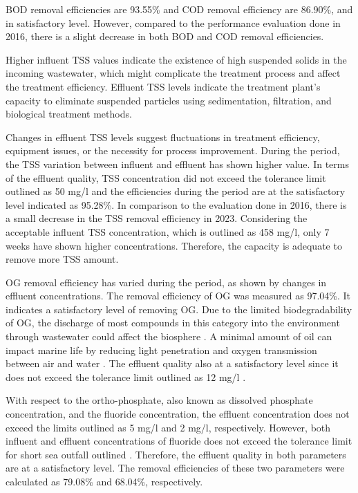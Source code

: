 \ac{BOD} removal efficiencies are 93.55\% and \ac{COD} removal efficiency are 86.90\%, and in satisfactory level. However, compared to the performance evaluation done in 2016, there is a slight decrease in both \ac{BOD} and \ac{COD} removal efficiencies.

Higher influent \ac{TSS} values indicate the existence of high suspended solids in the incoming wastewater, which might complicate the treatment process and affect the treatment efficiency. Effluent \ac{TSS} levels indicate the treatment plant's capacity to eliminate suspended particles using sedimentation, filtration, and biological treatment methods.

Changes in effluent \ac{TSS} levels suggest fluctuations in treatment efficiency, equipment issues, or the necessity for process improvement. During the period, the \ac{TSS} variation between influent and effluent has shown higher value. In terms of the effluent quality, \ac{TSS} concentration did not exceed the tolerance limit outlined as 50 mg/l \cite{CEA2022} and the efficiencies during the period are at the satisfactory level indicated as 95.28\%. In comparison to the evaluation done in 2016\cite{Danushika2016}, there is a small decrease in the \ac{TSS} removal efficiency in 2023.  Considering the acceptable influent \ac{TSS} concentration, which is outlined as 458 mg/l, only 7 weeks have shown higher concentrations. Therefore, the capacity is adequate to remove more \ac{TSS} amount.

\ac{OG} removal efficiency has varied during the period, as shown by changes in effluent concentrations. The removal efficiency of \ac{OG} was measured as 97.04\%. It indicates a satisfactory level of removing \ac{OG}. Due to the limited biodegradability of \ac{OG}, the discharge of most compounds in this category into the environment through wastewater could affect the biosphere \cite{Wahi2013}. A minimal amount of oil can impact marine life by reducing light penetration and oxygen transmission between air and water \cite{Roques2011}. The effluent quality also at a satisfactory level since it does not exceed the tolerance limit outlined as 12 mg/l \cite{CEA2022}. 

With respect to the ortho-phosphate, also known as dissolved phosphate concentration, and the fluoride concentration, the effluent concentration does not exceed the limits outlined as 5 mg/l and 2 mg/l, respectively. However, both influent and effluent concentrations of fluoride does not exceed the tolerance limit for short sea outfall outlined \cite{CEA2022}. Therefore, the effluent quality in both parameters are at a satisfactory level. The removal efficiencies of these two parameters were calculated as 79.08\% and 68.04\%, respectively.

